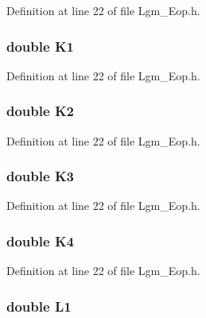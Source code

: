 Definition at line 22 of file Lgm\_\-Eop.h.\hypertarget{struct_lgm___nga_eopp_9f00f56b6145687842cf478b182b8f36}{
\subsubsection[{K1}]{\setlength{\rightskip}{0pt plus 5cm}double {\bf K1}}}
\label{struct_lgm___nga_eopp_9f00f56b6145687842cf478b182b8f36}




Definition at line 22 of file Lgm\_\-Eop.h.\hypertarget{struct_lgm___nga_eopp_2e65f840fe090660c4e720b3734e6097}{
\subsubsection[{K2}]{\setlength{\rightskip}{0pt plus 5cm}double {\bf K2}}}
\label{struct_lgm___nga_eopp_2e65f840fe090660c4e720b3734e6097}




Definition at line 22 of file Lgm\_\-Eop.h.\hypertarget{struct_lgm___nga_eopp_bdb2b6a7192df636bda8c1f9fd81d55e}{
\subsubsection[{K3}]{\setlength{\rightskip}{0pt plus 5cm}double {\bf K3}}}
\label{struct_lgm___nga_eopp_bdb2b6a7192df636bda8c1f9fd81d55e}




Definition at line 22 of file Lgm\_\-Eop.h.\hypertarget{struct_lgm___nga_eopp_d79fd8b5247c7e4ff95b48d8021c0791}{
\subsubsection[{K4}]{\setlength{\rightskip}{0pt plus 5cm}double {\bf K4}}}
\label{struct_lgm___nga_eopp_d79fd8b5247c7e4ff95b48d8021c0791}




Definition at line 22 of file Lgm\_\-Eop.h.\hypertarget{struct_lgm___nga_eopp_04e228860c09a4173c44af849a8b878f}{
\subsubsection[{L1}]{\setlength{\rightskip}{0pt plus 5cm}double {\bf L1}}}
\label{struct_lgm___nga_eopp_04e228860c09a4173c44af849a8b878f}




